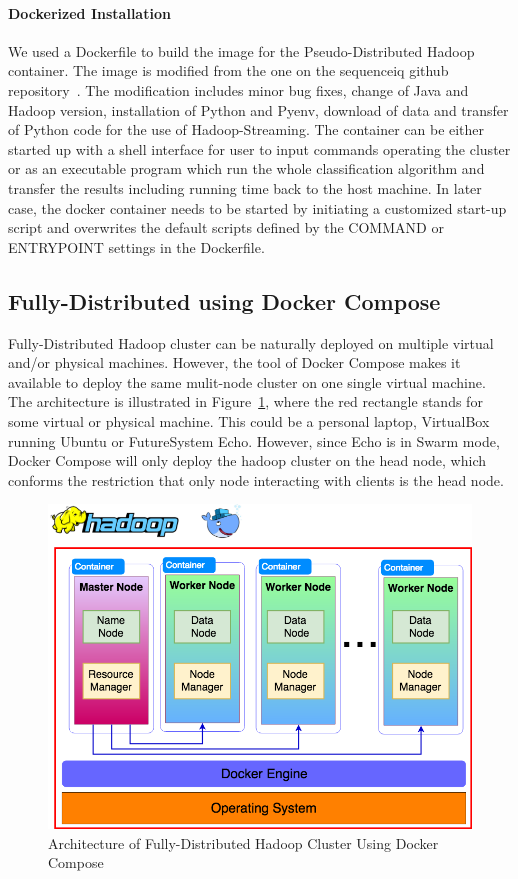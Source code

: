 \paragraph{Dockerized Installation} We used a Dockerfile to build the 
image for the Pseudo-Distributed Hadoop container. The image is modified 
from the one on the sequenceiq github 
repository~\cite{hid-sp18-405-hadoop-sequenceiq}. The modification 
includes minor bug fixes, change of Java and Hadoop version, installation of 
Python and Pyenv, download of data and transfer of Python code for the use 
of Hadoop-Streaming. The container can be either started up with a shell 
interface for user to input commands operating the cluster or as an 
executable program which run the whole classification algorithm and transfer 
the results including running time back to the host machine. In later case, the 
docker container needs to be started by initiating a customized start-up 
script and overwrites the default scripts defined by the COMMAND or 
ENTRYPOINT settings in the Dockerfile. 


\subsection{Fully-Distributed using Docker Compose}

Fully-Distributed Hadoop cluster can be naturally deployed on multiple virtual 
and/or physical machines. However, the tool of Docker Compose makes it 
available to deploy the same mulit-node cluster on one single virtual machine. 
The architecture is illustrated in Figure~\ref{f:hadoop-compose}, where the 
red rectangle stands for some virtual or physical machine. This could be a 
personal laptop, VirtualBox running Ubuntu or FutureSystem Echo. However, 
since Echo is in Swarm mode, Docker Compose will only deploy the hadoop 
cluster on the head node, which conforms the restriction that only node 
interacting with clients is the head node. 

\begin{figure}[!ht]
	\centering\includegraphics[width=\columnwidth]{images/hadoop-docker-compose.png}
	\caption{Architecture of Fully-Distributed 
		Hadoop Cluster Using Docker Compose}\label{f:hadoop-compose}
\end{figure}

